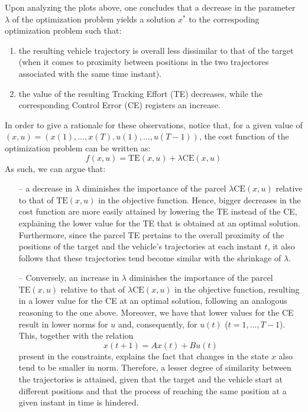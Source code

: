 \documentclass[12pt]{article}
\begin{document}
Upon analyzing the plots above, one concludes that a decrease in the parameter $\lambda$ of the optimization problem yields a solution $x^*$ to the correspoding optimization problem such that:
\begin{enumerate}
    \item the resulting vehicle trajectory is overall less dissimilar to that of the target (when it comes to proximity between positions in the two trajectores associated with the same time instant).
    \item the value of the resulting Tracking Effort (TE) decreases, while the corresponding Control Error (CE) registers an increase.
\end{enumerate}
In order to give a rationale for these observations, notice that, for a given value of $(x, u) = (x(1), ..., x(T), u(1), ..., u(T - 1))$, the cost function of the optimization problem can be written as:
\vspace{-0.2em}
\[
    f(x, u) = \text{TE}(x, u) + \lambda \text{CE}(x, u)
\]
As such, we can argue that:
\begin{itemize}
    \item[--] a decrease in $\lambda$ diminishes the importance of the parcel $\lambda \text{CE}(x, u)$ relative to that of $\text{TE}(x, u)$ in the objective function. Hence, bigger decreases in the cost function are more easily attained by lowering the TE instead of the CE, explaining the lower value for the TE that is obtained at an optimal solution. Furthermore, since the parcel TE pertains to the overall proximity of the positions of the target and the vehicle's trajectories at each instant $t$, it also follows that these trajectories tend become similar with the shrinkage of $\lambda$.
    \item[--] Conversely, an increase in $\lambda$ diminishes the importance of the parcel $\text{TE}(x, u)$ relative to that of $\lambda \text{CE}(x, u)$ in the objective function, resulting in a lower value for the CE at an optimal solution, following an analogous reasoning to the one above. Moreover, we have that lower values for the CE result in lower norms for $u$ and, consequently, for $u(t)$ ($t = 1, ..., T-1$). This, together with the relation
    \[
        x(t + 1) = Ax(t) + Bu(t)
    \]
    present in the constraints, explains the fact that changes in the state $x$ also tend to be smaller in norm. Therefore, a lesser degree of similarity between the trajectories is attained, given that the target and the vehicle start at different positions and that the process of reaching the same position at a given instant in time is hindered.
\end{itemize}
\end{document}
